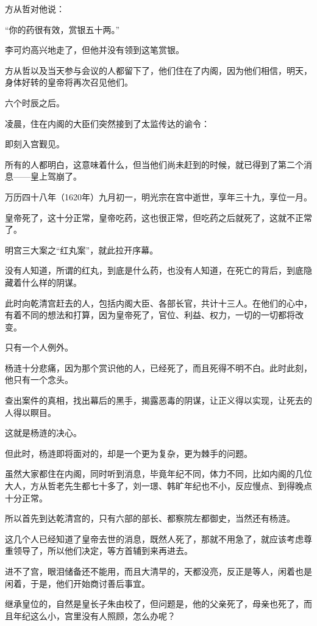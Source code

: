 \begin{multicols}{\theparacolNo}
		方从哲对他说：

		“你的药很有效，赏银五十两。”

		李可灼高兴地走了，但他并没有领到这笔赏银。

		方从哲以及当天参与会议的人都留下了，他们住在了内阁，因为他们相信，明天，身体好转的皇帝将再次召见他们。

		六个时辰之后。

		凌晨，住在内阁的大臣们突然接到了太监传达的谕令：

		即刻入宫觐见。

		所有的人都明白，这意味着什么，但当他们尚未赶到的时候，就已得到了第二个消息——皇上驾崩了。

		万历四十八年（1620年）九月初一，明光宗在宫中逝世，享年三十九，享位一月。

		皇帝死了，这十分正常，皇帝吃药，这也很正常，但吃药之后就死了，这就不正常了。

		明宫三大案之“红丸案”，就此拉开序幕。

		没有人知道，所谓的红丸，到底是什么药，也没有人知道，在死亡的背后，到底隐藏着什么样的阴谋。

		此时向乾清宫赶去的人，包括内阁大臣、各部长官，共计十三人。在他们的心中，有着不同的想法和打算，因为皇帝死了，官位、利益、权力，一切的一切都将改变。

		只有一个人例外。

		杨涟十分悲痛，因为那个赏识他的人，已经死了，而且死得不明不白。此时此刻，他只有一个念头。

		查出案件的真相，找出幕后的黑手，揭露恶毒的阴谋，让正义得以实现，让死去的人得以瞑目。

		这就是杨涟的决心。

		但此时，杨涟即将面对的，却是一个更为复杂，更为棘手的问题。

		虽然大家都住在内阁，同时听到消息，毕竟年纪不同，体力不同，比如内阁的几位大人，方从哲老先生都七十多了，刘一璟、韩旷年纪也不小，反应慢点、到得晚点十分正常。

		所以首先到达乾清宫的，只有六部的部长、都察院左都御史，当然还有杨涟。

		这几个人已经知道了皇帝去世的消息，既然人死了，那就不用急了，就应该考虑尊重领导了，所以他们决定，等方首辅到来再进去。

		进不了宫，眼泪储备还不能用，而且大清早的，天都没亮，反正是等人，闲着也是闲着，于是，他们开始商讨善后事宜。

		继承皇位的，自然是皇长子朱由校了，但问题是，他的父亲死了，母亲也死了，而且年纪这么小，宫里没有人照顾，怎么办呢？


\end{multicols}
